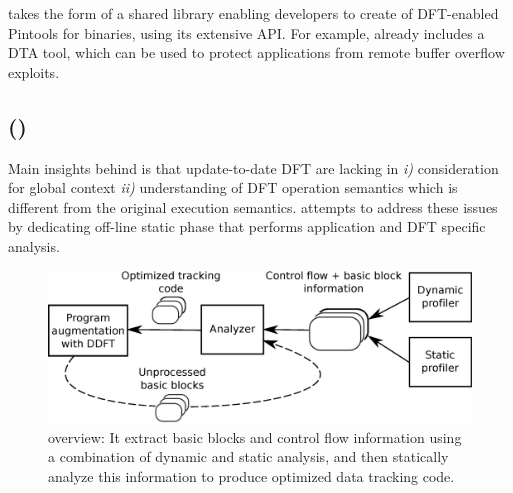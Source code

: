 \libdft takes the form of a shared library enabling developers to create of
DFT-enabled Pintools for binaries, using its extensive API. For example,
\libdft already includes a DTA tool, which can be used to protect applications
from remote buffer overflow exploits.

\subsection{\tfafull (\tfa)} 

Main insights behind \tfa is that update-to-date DFT are lacking in {\it i)}
consideration for global context {\it ii)} understanding of DFT operation
semantics which is different from the original execution semantics.  \tfa
attempts to address these issues by dedicating off-line static phase that
performs application and DFT specific analysis. 

\begin{figure}[tb]
    \centering
    \includegraphics[width=0.65\linewidth]{figs/overview_model.eps}
    \caption{\tfa overview: It extract basic blocks and control flow
    information using a combination of dynamic and static analysis, and then
    statically analyze this information to produce optimized data tracking
    code.
   \label{fig:approach_overview}}
\end{figure}

